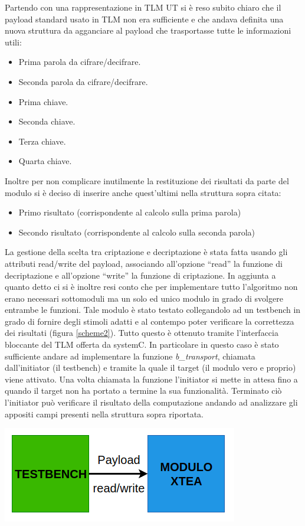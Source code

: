 \documentclass[]{IEEEtran}
\begin{document}
Partendo con una rappresentazione in TLM UT si è reso subito chiaro che il payload standard usato in TLM non era sufficiente e che andava definita una nuova struttura da agganciare al payload che trasportasse tutte le informazioni utili:
\begin{itemize}
	\item Prima parola da cifrare/decifrare.
	\item Seconda parola da cifrare/decifrare.
	\item Prima chiave.
	\item Seconda chiave.
	\item Terza chiave.
	\item Quarta chiave.
\end{itemize}
Inoltre per non complicare inutilmente la restituzione dei risultati da parte del modulo si è deciso di inserire anche quest'ultimi nella struttura sopra citata:
\begin{itemize}
	\item Primo risultato (corrispondente al calcolo sulla prima parola)
	\item Secondo risultato (corrispondente al calcolo sulla seconda parola)
\end{itemize}
La gestione della scelta tra criptazione e decriptazione è stata fatta usando gli attributi read/write del payload, associando all'opzione ``read'' la funzione di decriptazione e all'opzione ``write'' la funzione di criptazione.
In aggiunta a quanto detto ci si è inoltre resi conto che per implementare tutto l'algoritmo non erano necessari sottomoduli ma un solo ed unico modulo in grado di svolgere entrambe le funzioni. Tale modulo è stato testato collegandolo ad un testbench in grado di fornire degli stimoli adatti e al contempo poter verificare la correttezza dei risultati (figura \ref{scheme2}). Tutto questo è ottenuto tramite l'interfaccia bloccante del TLM offerta da systemC. In particolare in questo caso è stato sufficiente andare ad implementare la funzione \emph{b\_transport}, chiamata dall'initiator (il testbench) e tramite la quale il target (il modulo vero e proprio) viene attivato. Una volta chiamata la funzione l'initiator si mette in attesa fino a quando il target non ha portato a termine la sua funzionalità. Terminato ciò l'initiator può verificare il risultato della computazione andando ad analizzare gli appositi campi presenti nella struttura sopra riportata.
\begin{center}
	\includegraphics[width=\columnwidth]{Images/scheme2.png}
	\label{scheme2}
\end{center}
\end{document}
